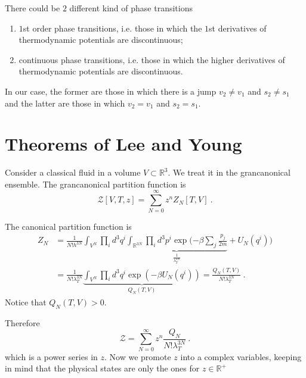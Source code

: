     There could be $2$ different kind of phase transitions 
    \begin{enumerate}
        \item $1$st order phase transitions, i.e. those in which the $1$st derivatives of thermodynamic potentials are discontinuous;
        \item continuous phase transitions, i.e. those in which the higher derivatives of thermodynamic potentials are discontinuous.
    \end{enumerate}

    In our case, the former are those in which there is a jump $v_2 \neq v_1$ and $s_2 \neq s_1$ and the latter are those in which $v_2 = v_1$ and $s_2 = s_1$. 

\chapter{Theorems of Lee and Young}

    Consider a classical fluid in a volume $V \subset \mathbb R^3$. We treat it in the grancanonical ensemble. The grancanonical partition function is 
    \begin{equation*}
        \mathcal Z [V, T, z] = \sum_{N=0}^\infty z^n Z_N[T, V] ~.
    \end{equation*}

    The canonical partition function is 
    \begin{equation*}
    \begin{aligned}
        Z_N & = \frac{1}{N! h^{3N}} \int_{V^N} \prod_i d^3 q^i \underbrace{\int_{\mathbb R^{3N}} \prod_i d^3 p^i  \exp (- \beta \sum_j \frac{p_j}{2m}}_{\frac{1}{\lambda_T^{3N}}} + U_N(q^i)) \\ & = \frac{1}{N! \lambda_T^{3N}} \underbrace{\int_{V^N}\prod_i d^3 q^i \exp (- \beta U_N(q^i))}_{Q_N (T, V)} = \frac{Q_N(T, V)}{N! \lambda_T^{3N}} ~.
    \end{aligned}
    \end{equation*}
    Notice that $Q_N(T,V) > 0$.

    Therefore 
    \begin{equation*}
        \mathcal Z = \sum_{N=0}^\infty z^n \frac{Q_N}{N! \lambda_T^{3N}} ~.
    \end{equation*}
    which is a power series in $z$. Now we promote $z$ into a complex variables, keeping in mind that the physical states are only the ones for $z \in \mathbb R^+$

